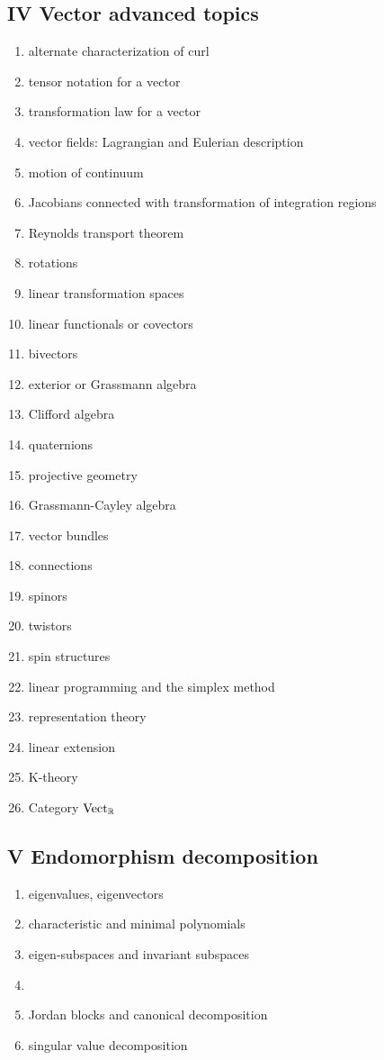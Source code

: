 \documentclass[12pt]{article}
\begin{document}
\subsection*{IV Vector advanced topics}
\begin{enumerate}
\item alternate characterization of curl
\item tensor notation for a vector
\item transformation law for a vector
\item vector fields: Lagrangian and Eulerian description
\item motion of continuum
\item Jacobians connected with transformation of integration regions
\item Reynolds transport theorem
\item rotations
\item linear transformation spaces
\item linear functionals or covectors
\item bivectors
\item exterior or Grassmann algebra
\item Clifford algebra
\item quaternions
\item projective geometry
\item Grassmann-Cayley algebra
\item vector bundles
\item connections
\item spinors
\item twistors
\item spin structures
\item linear programming and the simplex method
\item representation theory
\item linear extension
\item K-theory
\item Category ${\rm Vect}_{\mathbb{R}}$
\end{enumerate}

\subsection*{V Endomorphism decomposition}
\begin{enumerate}
\item eigenvalues, eigenvectors
\item characteristic and minimal polynomials
\item eigen-subspaces and invariant subspaces
\item {}
\item Jordan blocks and canonical decomposition
\item singular value decomposition
\end{enumerate}
\end{document}
